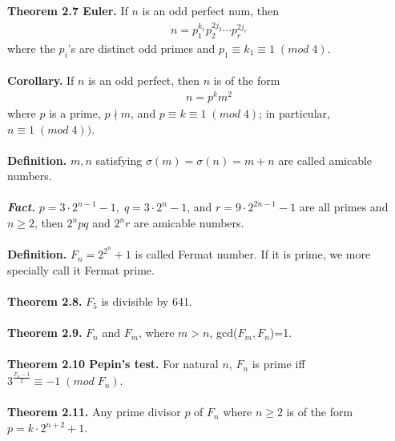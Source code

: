 \documentclass[a4paper,10pt]{article}
\begin{document}
\textbf{Theorem 2.7 Euler.} If $n$ is an odd perfect num, then 
\begin{align}
n=p_{1}^{k_{1}}p_{2}^{2j_{2}}\cdots p_{r}^{2j_{r}}
\end{align}
where the $p_{i}$'s are distinct odd primes and $p_{1}\equiv k_{1} \equiv 1 \; (mod \; 4)$. \\ \\
\textbf{Corollary.} If $n$ is an odd perfect, then $n$ is of the form 
\begin{align}
n=p^{k}m^{2}
\end{align}
where $p$ is a prime, $p\nmid m$, and $p\equiv k \equiv 1 \; (mod \; 4)$; in particular, $n \equiv 1 \; (mod \; 4))$. \\ \\
\textbf{Definition.} $m, n$ satisfying $\sigma(m)=\sigma(n)=m+n$ are called amicable numbers. \\ \\
\textit{\textbf{Fact.}} $p=3\cdot 2^{n-1}-1, \; q=3\cdot 2^{n}-1$, and $r=9\cdot 2^{2n-1}-1$ are all primes and $n \geq 2$, then $2^{n}pq$ and $2^{n}r$ are amicable numbers. \\ \\
\textbf{Definition.} $F_{n}=2^{2^{n}}+1$ is called Fermat number. If it is prime, we more specially call it Fermat prime. \\ \\
\textbf{Theorem 2.8.} $F_{5}$ is divisible by 641. \\ \\
\textbf{Theorem 2.9.} $F_{n}$ and $F_{m}$, where $m>n$, gcd($F_{m}, F_{n}$)=1. \\ \\
\textbf{Theorem 2.10 Pepin's test.} For natural $n$, $F_{n}$ is prime iff $3^{\frac{F_{n}-1}{2}}\equiv -1 \; (mod \; F_{n})$. \\ \\
\textbf{Theorem 2.11.} Any prime divisor $p$ of $F_{n}$ where $n \geq 2$ is of the form $p = k\cdot 2^{n+2}+1$. \\ \\
\end{document}
